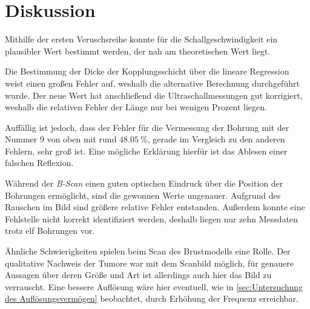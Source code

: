 \section{Diskussion}
\label{sec:Diskussion}
Mithilfe der ersten Veruschsreihe konnte für die Schallgeschwindigkeit ein plausibler
Wert bestimmt werden, der nah am theoretischen Wert liegt.

Die Bestimmung der Dicke der Kopplungsschicht über die lineare Regression weist einen großen Fehler auf,
weshalb die alternative Berechnung durchgeführt wurde.
Der neue Wert hat anschließend die Ultraschallmessungen gut korrigiert, weshalb die relativen
Fehler der Länge nur bei wenigen Prozent liegen.

Auffällig ist jedoch, dass der Fehler für die Vermessung der Bohrung mit der Nummer 9 von oben mit rund $\qty{48,05}{\percent}$, gerade 
im Vergleich zu den anderen Fehlern, sehr groß ist. Eine mögliche Erklärung hierfür ist das Ablesen einer falschen Reflexion.

Während der \textit{B-Scan} einen guten optischen Eindruck über die Position der Bohrungen ermöglicht,
sind die gewonnen Werte ungenauer. Aufgrund des Rauschen im Bild sind größere relative Fehler entstanden.
Außerdem konnte eine Fehlstelle nicht korrekt identifiziert werden, deshalb liegen nur zehn Messdaten
trotz elf Bohrungen vor.

Ähnliche Schwierigkeiten spielen beim Scan des Brustmodells eine Rolle. Der qualitative Nachweis der Tumore
war mit dem Scanbild möglich, für genauere Aussagen über deren Größe und Art ist allerdings auch hier das
Bild zu verrauscht. Eine bessere Auflösung wäre hier eventuell, wie in \ref{sec:Untersuchung des Auflösungsvermögen}
beobachtet, durch Erhöhung der Frequenz erreichbar.
